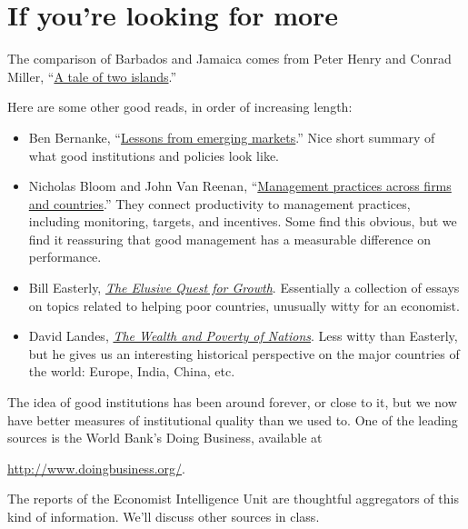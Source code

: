 \section*{If you're looking for more}

The comparison of Barbados and Jamaica comes from Peter Henry and Conrad Miller,
``\href{{http://www.aeaweb.org/articles.php?doi=10.1257/aer.99.2.261}}
{A tale of two islands}.''

Here are some other good reads, in order of increasing length:
\begin{itemize}
\item Ben Bernanke,
``\href{http://www.federalreserve.gov/newsevents/speech/bernanke20110928a.htm}
{Lessons from emerging markets}.''
Nice short summary of what good institutions and policies look like.

\item Nicholas Bloom and John Van Reenan,
``\href{http://www.aeaweb.org/articles.php?doi=10.1257/jep.24.1.203}
    {Management practices across firms and countries}.''
They connect productivity to management practices, including
monitoring, targets, and incentives.
Some find this obvious, but we find it reassuring that 
good management has a measurable difference
on performance.

\item Bill Easterly,
\href{http://www.amazon.com/Elusive-Quest-Growth-Economists-Misadventures/dp/0262550423}
{\it The Elusive Quest for Growth}.
Essentially a collection of essays on topics related to helping poor countries,
unusually witty for an economist.

\item David Landes,
\href{http://www.amazon.com/Wealth-Poverty-Nations-Some-Rich/dp/0393318885}
{\it The Wealth and Poverty of Nations}.
Less witty than Easterly, but he gives us an interesting historical
perspective on the major countries of the world:  Europe, India, China, etc.
\end{itemize}

The idea of good institutions has been around forever, or close to it,
but we now have better measures of institutional quality than we used to.
One of the leading sources is the World Bank's Doing Business, available at

\vspace*{\parskip}
\centerline{\url{http://www.doingbusiness.org/}.}

The reports of the Economist Intelligence Unit are thoughtful aggregators
of this kind of information.
We'll discuss other sources in class.


